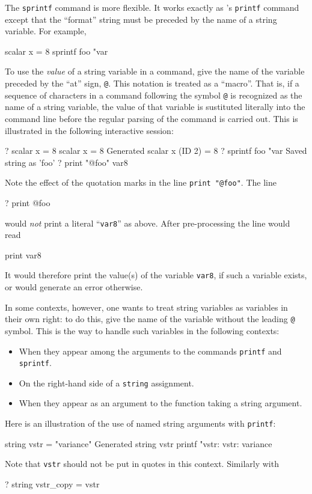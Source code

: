 The \texttt{sprintf} command is more flexible.  It works exactly as
's \texttt{printf} command except that the ``format''
string must be preceded by the name of a string variable.  For
example,
%
\begin{code}
scalar x = 8
sprintf foo "var%
\end{code}

To use the \emph{value} of a string variable in a command, give the
name of the variable preceded by the ``at'' sign, \verb|@|.  This
notation is treated as a ``macro''.  That is, if a sequence of
characters in a  command following the symbol \verb|@| is
recognized as the name of a string variable, the value of that
variable is sustituted literally into the command line before the
regular parsing of the command is carried out.  This is illustrated in
the following interactive session:
%
\begin{code}
? scalar x = 8
 scalar x = 8
Generated scalar x (ID 2) = 8
? sprintf foo "var%
Saved string as 'foo'
? print "@foo"
var8
\end{code}
%
Note the effect of the quotation marks in the line 
\verb|print "@foo"|.  The line
%
\begin{code}
? print @foo
\end{code}
%
would \textit{not} print a literal ``\texttt{var8}'' as above.  After
pre-processing the line would read
%
\begin{code}
print var8
\end{code}
%
It would therefore print the value(s) of the variable \texttt{var8},
if such a variable exists, or would generate an error otherwise.

In some contexts, however, one wants to treat string variables as
variables in their own right: to do this, give the name of
the variable without the leading \verb|@| symbol.  This is the
way to handle such variables in the following contexts:

\begin{itemize}
\item When they appear among the arguments to the commands \texttt{printf} and
  \texttt{sprintf}.
\item On the right-hand side of a \texttt{string} assignment.
\item When they appear as an argument to the function taking
  a string argument.
\end{itemize}

Here is an illustration of the use of named string arguments with
\texttt{printf}:
%
\begin{code}
string vstr = "variance"
Generated string vstr
printf "vstr: %
vstr:     variance
\end{code}
%
Note that \texttt{vstr} should not be put in quotes in this context.
Similarly with
\begin{code}
? string vstr_copy = vstr
\end{code}

